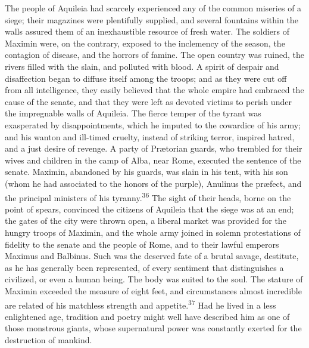 The people of Aquileia had scarcely experienced any of the common
miseries of a siege; their magazines were plentifully supplied,
and several fountains within the walls assured them of an
inexhaustible resource of fresh water. The soldiers of Maximin
were, on the contrary, exposed to the inclemency of the season,
the contagion of disease, and the horrors of famine. The open
country was ruined, the rivers filled with the slain, and
polluted with blood. A spirit of despair and disaffection began
to diffuse itself among the troops; and as they were cut off from
all intelligence, they easily believed that the whole empire had
embraced the cause of the senate, and that they were left as
devoted victims to perish under the impregnable walls of
Aquileia. The fierce temper of the tyrant was exasperated by
disappointments, which he imputed to the cowardice of his army;
and his wanton and ill-timed cruelty, instead of striking terror,
inspired hatred, and a just desire of revenge. A party of
Prætorian guards, who trembled for their wives and children in
the camp of Alba, near Rome, executed the sentence of the senate.
Maximin, abandoned by his guards, was slain in his tent, with his
son (whom he had associated to the honors of the purple),
Anulinus the præfect, and the principal ministers of his tyranny.\textsuperscript{36}
The sight of their heads, borne on the point of spears,
convinced the citizens of Aquileia that the siege was at an end;
the gates of the city were thrown open, a liberal market was
provided for the hungry troops of Maximin, and the whole army
joined in solemn protestations of fidelity to the senate and the
people of Rome, and to their lawful emperors Maximus and
Balbinus. Such was the deserved fate of a brutal savage,
destitute, as he has generally been represented, of every
sentiment that distinguishes a civilized, or even a human being.
The body was suited to the soul. The stature of Maximin exceeded
the measure of eight feet, and circumstances almost incredible
are related of his matchless strength and appetite.\textsuperscript{37} Had he
lived in a less enlightened age, tradition and poetry might well
have described him as one of those monstrous giants, whose
supernatural power was constantly exerted for the destruction of
mankind.


